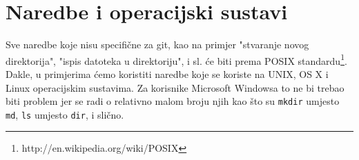 \section*{Naredbe i operacijski sustavi}

Sve naredbe koje nisu specifične za git, kao na primjer "stvaranje novog direktorija", "ispis datoteka u direktoriju", i sl. će biti prema POSIX standardu\footnote{http://en.wikipedia.org/wiki/POSIX}.
Dakle, u primjerima ćemo koristiti naredbe koje se koriste na UNIX, OS X i Linux operacijskim sustavima. 
Za korisnike Microsoft Windowsa to ne bi trebao biti problem jer se radi o relativno malom broju njih kao što su \verb+mkdir+ umjesto \verb+md+, \verb+ls+ umjesto \verb+dir+, i slično.
